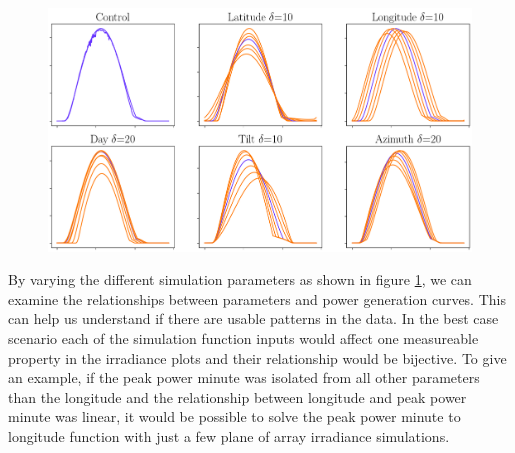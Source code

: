 











\newpage



\begin{figure}[ht!]
\centering
\includegraphics[width=0.8\linewidth]{pics/poa_eval_new_crop}
\label{fig_poa_different_parameters}
\end{figure}

By varying the different simulation parameters as shown in figure \ref{fig_poa_different_parameters}, we can examine the relationships between parameters and power generation curves. This can help us understand if there are usable patterns in the data. In the best case scenario each of the simulation function inputs would affect one measureable property in the irradiance plots and their relationship would be bijective. To give an example, if the peak power minute was isolated from all other parameters than the longitude and the relationship between longitude and peak power minute was linear, it would be possible to solve the peak power minute to longitude function with just a few plane of array irradiance simulations.

